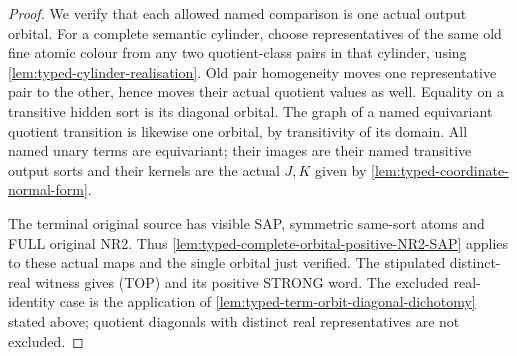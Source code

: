 \begin{proof}
We verify that each allowed named comparison is one actual output
orbital. For a complete semantic cylinder, choose representatives of
the same old fine atomic colour from any two quotient-class pairs in
that cylinder, using \cref{lem:typed-cylinder-realisation}. Old pair
homogeneity moves one representative pair to the other, hence moves
their actual quotient values as well. Equality on a transitive hidden
sort is its diagonal orbital. The graph of a named equivariant quotient
transition is likewise one orbital, by transitivity of its domain.
All named unary terms are equivariant; their images are their named
transitive output sorts and their kernels are the actual $J,K$ given by
\cref{lem:typed-coordinate-normal-form}.

The terminal original source has visible SAP, symmetric same-sort atoms
and FULL original NR2. Thus
\cref{lem:typed-complete-orbital-positive-NR2-SAP} applies to these
actual maps and the single orbital just verified. The stipulated
distinct-real witness gives (TOP) and its positive STRONG word.
The excluded real-identity case is the application of
\cref{lem:typed-term-orbit-diagonal-dichotomy} stated above; quotient
diagonals with distinct real representatives are not excluded.
\end{proof}

